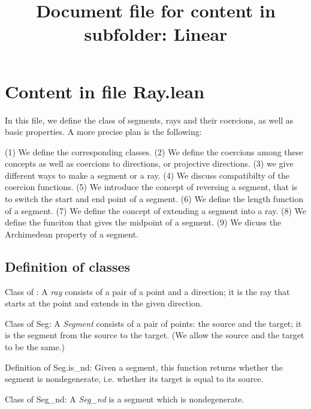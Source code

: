 \documentclass[12pt,a4paper]{article}
\title{Document file for content in subfolder: Linear}
\begin{document}
\section{Content in file Ray.lean}

In this file, we define the class of segments, rays and their coercions, as well as basic properties.  A more precise plan is the following:

(1) We define the corresponding classes. 
(2) We define the coercions among these concepts as well as coercions to directions, or projective directions.
(3) we give different ways to make a segment or a ray.
(4) We discuss compatibilty of the coercion functions.
(5) We introduce the concept of reversing a segment, that is to switch the start and end point of a segment.
(6) We define the length function of a segment.
(7) We define the concept of extending a segment into a ray.
(8) We define the funciton that gives the midpoint of a segment.
(9) We dicuss the Archimedean property of a segment.

\subsection{Definition of classes}

Class of : A \emph{ray} consists of a pair of a point and a direction; it is the ray that starts at the point and extends in the given direction.

Class of Seg: A \emph{Segment} consists of a pair of points: the source and the target; it is the segment from the source to the target. (We allow the source and the target to be the same.)

Definition of Seg.is_nd: Given a segment, this function returns whether the segment is nondegenerate, i.e. whether its target is equal to its source.

Class of Seg_nd: A \emph{Seg_nd} is a segment which is nondegenerate.
\end{document}
